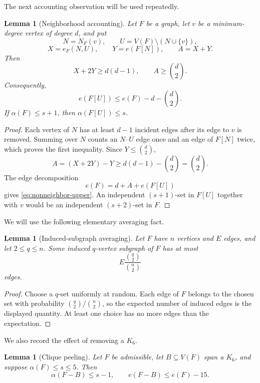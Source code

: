 \documentclass[11pt,reqno,a4paper]{amsart}
\newtheorem{lemma}[theorem]{Lemma}
\theoremstyle{definition}
\theoremstyle{remark}
\begin{document}
The next accounting observation will be used repeatedly.

\begin{lemma}[Neighborhood accounting]\label{lem:accounting}
Let $F$ be a graph, let $v$ be a minimum-degree vertex of degree $d$, and put
\[
  N=N_F(v),\qquad U=V(F)\setminus(N\cup\{v\}),
\]
\[
  X=e_F(N,U),\qquad Y=e(F[N]),\qquad A=X+Y.
\]
Then
\begin{equation}\label{eq:accounting}
  X+2Y\geq d(d-1),
  \qquad A\geq\binom d2.
\end{equation}
Consequently,
\begin{equation}\label{eq:nonneighbor-upper}
  e(F[U])\leq e(F)-d-\binom d2.
\end{equation}
If $\alpha(F)\leq s+1$, then $\alpha(F[U])\leq s$.
\end{lemma}

\begin{proof}
Each vertex of $N$ has at least $d-1$ incident edges after its edge to $v$
is removed.  Summing over $N$ counts an $N$--$U$ edge once and an edge of
$F[N]$ twice, which proves the first inequality.  Since
$Y\leq\binom d2$,
\[
  A=(X+2Y)-Y\geq d(d-1)-\binom d2=\binom d2.
\]
The edge decomposition
\[
  e(F)=d+A+e(F[U])
\]
gives \eqref{eq:nonneighbor-upper}.  An independent $(s+1)$-set in $F[U]$
together with $v$ would be an independent $(s+2)$-set in $F$.
\end{proof}

We will use the following elementary averaging fact.

\begin{lemma}[Induced-subgraph averaging]\label{lem:averaging}
Let $F$ have $n$ vertices and $E$ edges, and let $2\leq q\leq n$.  Some
induced $q$-vertex subgraph of $F$ has at most
\[
  E\frac{\binom q2}{\binom n2}
\]
edges.
\end{lemma}

\begin{proof}
Choose a $q$-set uniformly at random.  Each edge of $F$ belongs to the
chosen set with probability $\binom q2/\binom n2$, so the expected number
of induced edges is the displayed quantity.  At least one choice has no
more edges than the expectation.
\end{proof}

We also record the effect of removing a $K_6$.

\begin{lemma}[Clique peeling]\label{lem:peeling}
Let $F$ be admissible, let $B\subseteq V(F)$ span a $K_6$, and suppose
$\alpha(F)\leq s\leq5$.  Then
\[
  \alpha(F-B)\leq s-1,
  \qquad e(F-B)\leq e(F)-15.
\]
\end{lemma}
\end{document}
